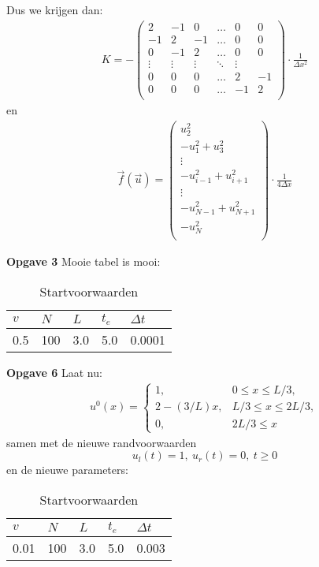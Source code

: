 \documentclass{article}
\newcommand{\Dt}{\Delta t}
\begin{document}
Dus we krijgen dan:
\begin{align*}
K = -\begin{pmatrix}
2 & -1 & 0 & \hdots & 0 & 0\\
-1 & 2 & -1 & \hdots & 0 & 0\\
0 & -1 & 2 & \hdots & 0 & 0\\
\vdots & \vdots & \vdots & \ddots & \vdots\\
0 & 0 & 0 & \hdots & 2 & -1\\
0 & 0 & 0 & \hdots & -1 & 2\\
\end{pmatrix}\cdot\frac{1}{\Delta x^2}
\end{align*}
en
\begin{align*}
\vec{f}(\vec{u}) = 
\begin{pmatrix}
u_2^2\\
-u_1^2 + u_3^2\\
\vdots\\
-u_{i-1}^2+u_{i+1}^2\\
\vdots\\
-u_{N-1}^2+u_{N+1}^2\\
-u_N^2\\
\end{pmatrix}
\cdot\frac{1}{4\Delta x}
\end{align*}

\textbf{Opgave 3}
Mooie tabel is mooi:

\begin{table}[h!]
\centering

\label{tab:specs}
\begin{tabular}{|l|l|l|l|l|}
\hline
\(v\) & \(N\) & \(L\) & \(t_e\) & \(\Dt\) \\ \hline
 0.5 & 100 & 3.0 & 5.0 & 0.0001 \\ \hline
\end{tabular}
\caption{Startvoorwaarden}
\end{table}
\textbf{Opgave 6}
Laat nu: 
\begin{align*}
	u^0(x) =\begin{cases}
	1, & 0\leq x \leq L/3,\\
	2-(3/L)x, & L/3 \leq x\leq 2L/3,\\
	0, & 2L/3 \leq x
	\end{cases}
\end{align*}
samen met de nieuwe randvoorwaarden 
\[u_l(t)=1,~u_r(t)=0,~t\geq 0\]
en de nieuwe parameters:
\begin{table}[h!]
\centering

\label{tab:specs2}
\begin{tabular}{|l|l|l|l|l|}
\hline
\(v\) & \(N\) & \(L\) & \(t_e\) & \(\Dt\) \\ \hline
 0.01 & 100 & 3.0 & 5.0 & 0.003 \\ \hline
\end{tabular}
\caption{Startvoorwaarden}
\end{table}
\end{document}
